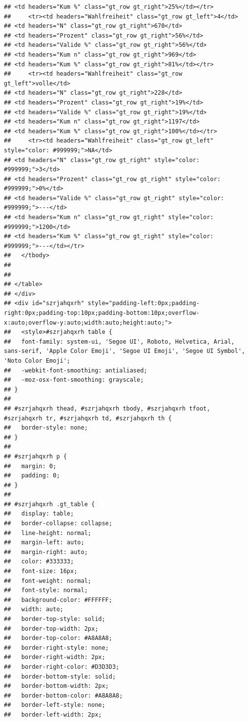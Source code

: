\documentclass[
  a4paper,
  DIV=11,
  numbers=noendperiod]{scrartcl}
\begin{document}
\begin{verbatim}
## <td headers="Kum %" class="gt_row gt_right">25%</td></tr>
##     <tr><td headers="Wahlfreiheit" class="gt_row gt_left">4</td>
## <td headers="N" class="gt_row gt_right">670</td>
## <td headers="Prozent" class="gt_row gt_right">56%</td>
## <td headers="Valide %" class="gt_row gt_right">56%</td>
## <td headers="Kum n" class="gt_row gt_right">969</td>
## <td headers="Kum %" class="gt_row gt_right">81%</td></tr>
##     <tr><td headers="Wahlfreiheit" class="gt_row gt_left">volle</td>
## <td headers="N" class="gt_row gt_right">228</td>
## <td headers="Prozent" class="gt_row gt_right">19%</td>
## <td headers="Valide %" class="gt_row gt_right">19%</td>
## <td headers="Kum n" class="gt_row gt_right">1197</td>
## <td headers="Kum %" class="gt_row gt_right">100%</td></tr>
##     <tr><td headers="Wahlfreiheit" class="gt_row gt_left" style="color: #999999;">NA</td>
## <td headers="N" class="gt_row gt_right" style="color: #999999;">3</td>
## <td headers="Prozent" class="gt_row gt_right" style="color: #999999;">0%</td>
## <td headers="Valide %" class="gt_row gt_right" style="color: #999999;">---</td>
## <td headers="Kum n" class="gt_row gt_right" style="color: #999999;">1200</td>
## <td headers="Kum %" class="gt_row gt_right" style="color: #999999;">---</td></tr>
##   </tbody>
##   
##   
## </table>
## </div>
## <div id="szrjahqxrh" style="padding-left:0px;padding-right:0px;padding-top:10px;padding-bottom:10px;overflow-x:auto;overflow-y:auto;width:auto;height:auto;">
##   <style>#szrjahqxrh table {
##   font-family: system-ui, 'Segoe UI', Roboto, Helvetica, Arial, sans-serif, 'Apple Color Emoji', 'Segoe UI Emoji', 'Segoe UI Symbol', 'Noto Color Emoji';
##   -webkit-font-smoothing: antialiased;
##   -moz-osx-font-smoothing: grayscale;
## }
## 
## #szrjahqxrh thead, #szrjahqxrh tbody, #szrjahqxrh tfoot, #szrjahqxrh tr, #szrjahqxrh td, #szrjahqxrh th {
##   border-style: none;
## }
## 
## #szrjahqxrh p {
##   margin: 0;
##   padding: 0;
## }
## 
## #szrjahqxrh .gt_table {
##   display: table;
##   border-collapse: collapse;
##   line-height: normal;
##   margin-left: auto;
##   margin-right: auto;
##   color: #333333;
##   font-size: 16px;
##   font-weight: normal;
##   font-style: normal;
##   background-color: #FFFFFF;
##   width: auto;
##   border-top-style: solid;
##   border-top-width: 2px;
##   border-top-color: #A8A8A8;
##   border-right-style: none;
##   border-right-width: 2px;
##   border-right-color: #D3D3D3;
##   border-bottom-style: solid;
##   border-bottom-width: 2px;
##   border-bottom-color: #A8A8A8;
##   border-left-style: none;
##   border-left-width: 2px;

\end{verbatim}
\end{document}
